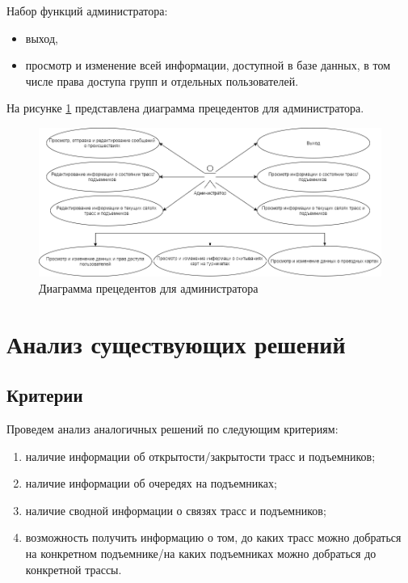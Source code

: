 	
	
\clearpage	
Набор функций администратора:
	\begin{itemize}
		\item выход,
		\item просмотр и изменение всей 
		информации, доступной в базе данных, в том числе права доступа групп и отдельных пользователей.
	\end{itemize}

На рисунке \ref{img:use_case4} представлена диаграмма прецедентов  для администратора.

\begin{figure}[h!]
	\begin{center}
		\includegraphics[scale=0.48]{../imgs/use_case/use-case4.png}
	\end{center}
	\captionsetup{justification=centering}
	\caption{Диаграмма прецедентов для администратора}
	\label{img:use_case4}
\end{figure}


\section{Анализ существующих решений}

\subsection{Критерии}\label{criteria}

Проведем анализ аналогичных решений по следующим критериям:
\begin{enumerate}
\item наличие информации об открытости/закрытости трасс и подъемников;
\item наличие информации об очередях на подъемниках; 
\item наличие сводной информации о связях трасс и подъемников;
\item возможность получить информацию о том, до каких трасс можно добраться на конкретном подъемнике/на каких подъемниках можно добраться до конкретной трассы.
\end{enumerate}

